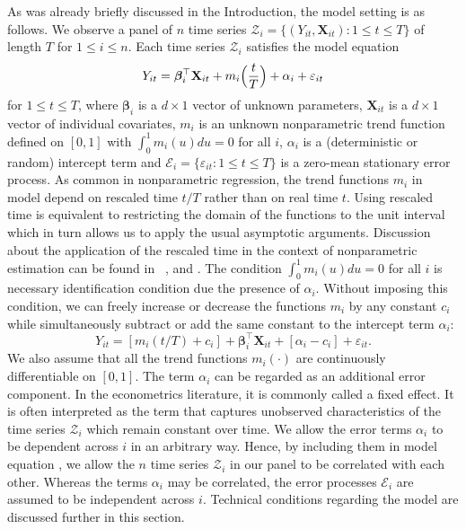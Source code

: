 \documentclass[a4paper,12pt]{article}
\makeatletter
\renewcommand{\eqref}[1]{\tagform@{\ref{#1}}}
\makeatother
\begin{document}
As was already briefly discussed in the Introduction, the model setting is as follows. We observe a panel of $n$ time series $\mathcal{Z}_i = \{(Y_{it}, \mathbf{X}_{it}): 1 \le t \le T \}$ of length $T$ for $1 \le i \le n$. Each time series $\mathcal{Z}_i$ satisfies the model equation 
\begin{equation}\label{eq:model_full}
Y_{it} = \bm{\beta}^\top_i \mathbf{X}_{it} + m_i \Big( \frac{t}{T} \Big) + \alpha_i + \varepsilon_{it} 
\end{equation}
for $1 \le t \le T$, where $\bm{\beta}_i$ is a $d \times 1$ vector of unknown parameters, $\mathbf{X}_{it}$ is a $d\times 1$ vector of individual covariates, $m_i$ is an unknown nonparametric trend function defined on $[0,1]$ with $\int_0^1 m_i(u) du = 0$ for all $i$, $\alpha_i$ is a (deterministic or random) intercept term and $\mathcal{E}_i = \{ \varepsilon_{it}: 1 \le t \le T \}$ is a zero-mean stationary error process. As common in nonparametric regression, the trend functions $m_i$ in model \eqref{eq:model_full} depend on rescaled time $t/T$ rather than on real time $t$. Using rescaled time is equivalent to restricting the domain of the functions to the unit interval which in turn allows us to apply the usual asymptotic arguments. Discussion about the application of the rescaled time in the context of nonparametric estimation can be found in \ \cite{Robinson1989}, \cite{Dahlhaus1997} and \cite{VogtLinton2014}. The condition $\int_0^1 m_i(u) du = 0$ for all $i$ is necessary identification condition due the presence of  $\alpha_i$. Without imposing this condition, we can freely increase or decrease the functions $m_i$ by any constant $c_i$ while simultaneously subtract or add the same constant to the intercept term $\alpha_i$:
$$Y_{it} = [m_i(t/T) + c_i] + \bm{\beta}_i^\top \mathbf{X}_{it} + [\alpha_i - c_i] + \varepsilon_{it}.$$
We also assume that all the trend functions $m_i(\cdot)$ are continuously differentiable on $[0, 1]$. The term $\alpha_i$ can be regarded as an additional error component. In the econometrics literature, it is commonly called a fixed effect. It is often interpreted as the term that captures unobserved characteristics of the time series $\mathcal{Z}_i$ which remain constant over time. We allow the error terms $\alpha_i$ to be dependent across $i$ in an arbitrary way. Hence, by including them in model equation \eqref{eq:model_full}, we allow the $n$ time series $\mathcal{Z}_i$ in our panel to be correlated with each other. Whereas the terms $\alpha_i$ may be correlated, the error processes $\mathcal{E}_i$ are assumed to be independent across $i$. Technical conditions regarding the model are discussed further in this section.
\end{document}
